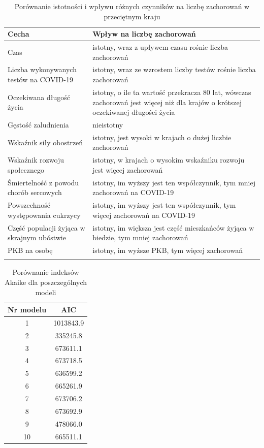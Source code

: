 \documentclass[12pt]{mwbk}
\theoremstyle{plain}
\theoremstyle{definition}
\theoremstyle{remark}
\begin{document}
\begin{longtable}{| p{} | p{} |}
	\hline
	Cecha & Wpływ na liczbę zachorowań \\ \hline 
	Czas & istotny, wraz z upływem czasu rośnie liczba zachorowań \\ \hline
	Liczba wykonywanych testów na COVID-19 & istotny, wraz ze wzrostem liczby testów rośnie liczba zachorowań \\ \hline
	Oczekiwana długość życia & istotny, o ile ta wartość przekracza 80 lat, wówczas zachorowań jest więcej niż dla krajów o krótszej oczekiwanej długości życia \\ \hline 
	Gęstość zaludnienia & nieistotny \\ \hline
	Wskaźnik siły obostrzeń & istotny, jest wysoki w krajach o dużej liczbie zachorowań \\ \hline
	Wskaźnik rozwoju społecznego & istotny, w krajach o wysokim wskaźniku rozwoju jest więcej zachorowań \\ \hline
	Śmiertelność z powodu chorób sercowych & istotny, im wyższy jest ten współczynnik, tym mniej zachorowań na COVID-19 \\ \hline
	Powszechność występowania cukrzycy & istotny, im wyższy jest ten współczynnik, tym więcej zachorowań na COVID-19 \\ \hline
	Część populacji żyjąca w skrajnym ubóstwie & istotny, im większa jest część mieszkańców żyjąca w biedzie, tym mniej zachorowań \\ \hline
	PKB na osobę & istotny, im wyższe PKB, tym więcej zachorowań \\ \hline
	\caption{Porównanie istotności i wpływu różnych czynników na liczbę zachorowań w przeciętnym kraju}
	\label{tab:istotnosc}
	\end{longtable}

\begin{table}
	\centering
	\begin{tabular}{|c|c|}
		\hline 
		Nr modelu&   AIC \\ \hline
		1 &  1013843.9 \\ \hline
		2 &  335245.8 \\ \hline
		3 &   673611.1 \\ \hline
		4 &   673718.5 \\ \hline
		5 &   636599.2 \\ \hline
		6 &   665261.9 \\ \hline
		7 &   673706.2 \\ \hline
		8 &   673692.9 \\ \hline
		9 &   478066.0 \\ \hline
		10&   665511.1 \\ \hline
	\end{tabular}
\caption{Porównanie indeksów Akaike dla poszczególnych modeli}
\label{tab:akaike}
\end{table}
\end{document}
